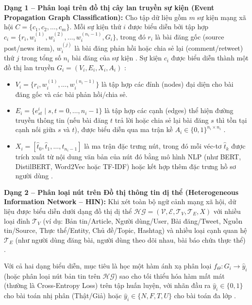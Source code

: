\documentclass[11pt,a4paper]{extreport}
\begin{document}
\textbf{Dạng 1 -- Phân loại trên đồ thị cây lan truyền sự kiện (Event Propagation Graph Classification):}
Cho tập dữ liệu gồm $m$ sự kiện mạng xã hội $C = \{c_1, c_2, \dots, c_m\}$. Mỗi sự kiện thứ $i$ được biểu diễn bởi tập hợp $c_i = \{r_i, w_i^{(1)}, w_i^{(2)}, \dots, w_i^{(n_i-1)}, G_i\}$, trong đó $r_i$ là bài đăng gốc (source post/news item), $w_i^{(j)}$ là bài đăng phản hồi hoặc chia sẻ lại (comment/retweet) thứ $j$ trong tổng số $n_i$ bài đăng của sự kiện \cite{noauthor_integrating_2025}. Sự kiện $c_i$ được biểu diễn thành một đồ thị lan truyền $G_i = (V_i, E_i, X_i, A_i)$ \cite{noauthor_exploiting_2024, noauthor_integrating_2025}:
\begin{itemize}
    \item $V_i = \{r_i, w_i^{(1)}, \dots, w_i^{(n_i-1)}\}$ là tập hợp các đỉnh (nodes) đại diện cho bài đăng gốc và các bài phản hồi/chia sẻ.
    \item $E_i = \{e_{st}^i \mid s, t = 0, \dots, n_i-1\}$ là tập hợp các cạnh (edges) thể hiện đường truyền thông tin (nếu bài đăng $t$ trả lời hoặc chia sẻ lại bài đăng $s$ thì tồn tại cạnh nối giữa $s$ và $t$), được biểu diễn qua ma trận kề $A_i \in \{0, 1\}^{n_i \times n_i}$ \cite{noauthor_integrating_2025}.
    \item $X_i = [\hat{t}_0, \hat{t}_1, \dots, \hat{t}_{n_i-1}]$ là ma trận đặc trưng nút, trong đó mỗi véc-tơ $\hat{t}_k$ được trích xuất từ nội dung văn bản của nút đó bằng mô hình NLP (như BERT, DistilBERT, Word2Vec hoặc TF-IDF) hoặc kết hợp thêm đặc trưng hồ sơ người dùng \cite{noauthor_exploiting_2024, noauthor_co-attention_2025}.
\end{itemize}

\textbf{Dạng 2 -- Phân loại nút trên Đồ thị thông tin dị thể (Heterogeneous Information Network -- HIN):}
Khi xét toàn bộ ngữ cảnh mạng xã hội, dữ liệu được biểu diễn dưới dạng đồ thị dị thể $\mathcal{HG} = (\mathcal{V}, \mathcal{E}, \mathcal{T}_V, \mathcal{T}_E, X)$ với nhiều loại đỉnh $\mathcal{T}_V$ (ví dụ: Bản tin/Article, Người dùng/User, Bài đăng/Tweet, Nguồn tin/Source, Thực thể/Entity, Chủ đề/Topic, Hashtag) và nhiều loại cạnh quan hệ $\mathcal{T}_E$ (như người dùng đăng bài, người dùng theo dõi nhau, bài báo chứa thực thể) \cite{noauthor_dual_2025, cui_graph_2025, noauthor_heterogeneous_2024}.

Với cả hai dạng biểu diễn, mục tiêu là học một hàm ánh xạ phân loại $f_\Theta : G_i \rightarrow \hat{y}_i$ (hoặc phân loại nút bản tin trên $\mathcal{HG}$) sao cho tối thiểu hóa hàm mất mát (thường là Cross-Entropy Loss) trên tập huấn luyện, với nhãn đầu ra $\hat{y}_i \in \{0, 1\}$ cho bài toán nhị phân (Thật/Giả) hoặc $\hat{y}_i \in \{N, F, T, U\}$ cho bài toán đa lớp \cite{noauthor_disinformation_2024, noauthor_improving_2025, cui_graph_2025}.
\end{document}
